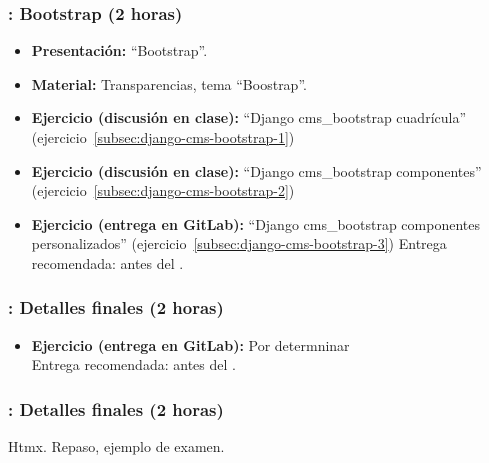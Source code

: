 \documentclass[a4paper,12pt]{article}
\begin{document}
\subsubsection{\martesL: Bootstrap (2 horas)}
\label{cal:martesL}

\begin{itemize}
\item \textbf{Presentación:} ``Bootstrap''.
 \item \textbf{Material:} Transparencias, tema ``Boostrap''.
   \item \textbf{Ejercicio (discusión en clase):} ``Django cms\_bootstrap cuadrícula'' (ejercicio~\ref{subsec:django-cms-bootstrap-1})
   \item \textbf{Ejercicio (discusión en clase):} ``Django cms\_bootstrap componentes'' (ejercicio~\ref{subsec:django-cms-bootstrap-2})
\item \textbf{Ejercicio (entrega en GitLab):} ``Django cms\_bootstrap componentes personalizados'' (ejercicio~\ref{subsec:django-cms-bootstrap-3})
  Entrega recomendada: antes del \martesM.
\end{itemize}

\subsubsection{\martesM: Detalles finales (2 horas)}
\label{cal:martesM}

\begin{itemize}
  \item \textbf{Ejercicio (entrega en GitLab):} Por determninar \\
  Entrega recomendada: antes del \martesN.
\end{itemize}


\subsubsection{\martesN: Detalles finales (2 horas)}
\label{cal:martesN}

Htmx. Repaso, ejemplo de examen.


\end{document}
